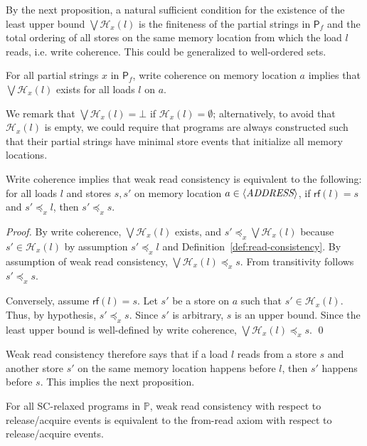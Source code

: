 \documentclass{llncs}
\newcommand{\sP}{\mathsf{P}}
\newcommand{\cH}{\mathcal{H}}
\newcommand{\bbP}{\mathbb{P}}
\begin{document}
By the next proposition, a natural sufficient condition for the existence of the least upper bound $\bigvee \cH_x(l)$ is the finiteness of the partial strings in $\sP_f$ and the total ordering of all stores on the same memory location from which the load $l$ reads, i.e. write coherence. This could be generalized to well-ordered sets.

\begin{proposition}
\label{proposition:weak-read-consistency-existence}
For all partial strings $x$ in $\sP_f$, write coherence on memory location $a$ implies that $\bigvee \cH_x(l)$ exists for all loads $l$ on $a$.
\end{proposition}

We remark that $\bigvee \cH_x(l) = \bot$ if $\cH_x(l) = \emptyset$; alternatively, to avoid that $\cH_x(l)$ is empty, we could require that programs are always constructed such that their partial strings have minimal store events that initialize all memory locations.

\begin{proposition}
\label{proposition:read-consistency-characterization}
Write coherence implies that weak read consistency is equivalent to the following: for all loads $l$ and stores $s, s'$ on memory location $a \in \langle\textit{ADDRESS}\rangle$, if $\mathsf{rf}(l) = s$ and $s' \preceq_x l$, then $s' \preceq_x s$.
\end{proposition}
\begin{proof}
By write coherence, $\bigvee \cH_x(l)$ exists, and $s' \preceq_x \bigvee \cH_x(l)$ because $s' \in \cH_x(l)$ by assumption $s' \preceq_x l$ and Definition~\ref{def:read-consistency}. By assumption of weak read consistency, $\bigvee \cH_x(l) \preceq_x s$. From transitivity follows $s' \preceq_x s$.

Conversely, assume $\mathsf{rf}(l) = s$. Let $s'$ be a store on $a$ such that $s' \in \cH_x(l)$. Thus, by hypothesis, $s' \preceq_x s$. Since $s'$ is arbitrary, $s$ is an upper bound. Since the least upper bound is well-defined by write coherence, $\bigvee \cH_x(l) \preceq_x s$. \qed
\end{proof}

Weak read consistency therefore says that if a load $l$ reads from a store $s$ and another store $s'$ on the same memory location happens before $l$, then $s'$ happens before $s$. This implies the next proposition. 

\begin{proposition}
\label{proposition:read-consistency-equivalence}
For all SC-relaxed programs in $\bbP$, weak read consistency with respect to release/acquire events is equivalent to the from-read axiom with respect to release/acquire events.
\end{proposition}
\end{document}
